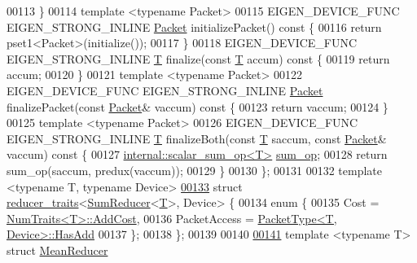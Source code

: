 \begin{DoxyCode}
00113   \}
00114   \textcolor{keyword}{template} <\textcolor{keyword}{typename} Packet>
00115   EIGEN\_DEVICE\_FUNC EIGEN\_STRONG\_INLINE \hyperlink{union_eigen_1_1internal_1_1_packet}{Packet} initializePacket()\textcolor{keyword}{ const }\{
00116     \textcolor{keywordflow}{return} pset1<Packet>(initialize());
00117   \}
00118   EIGEN\_DEVICE\_FUNC EIGEN\_STRONG\_INLINE \hyperlink{group___sparse_core___module}{T} finalize(\textcolor{keyword}{const} \hyperlink{group___sparse_core___module}{T} accum)\textcolor{keyword}{ const }\{
00119     \textcolor{keywordflow}{return} accum;
00120   \}
00121   \textcolor{keyword}{template} <\textcolor{keyword}{typename} Packet>
00122   EIGEN\_DEVICE\_FUNC EIGEN\_STRONG\_INLINE \hyperlink{union_eigen_1_1internal_1_1_packet}{Packet} finalizePacket(\textcolor{keyword}{const} \hyperlink{union_eigen_1_1internal_1_1_packet}{Packet}& vaccum)\textcolor{keyword}{ const }\{
00123     \textcolor{keywordflow}{return} vaccum;
00124   \}
00125   \textcolor{keyword}{template} <\textcolor{keyword}{typename} Packet>
00126   EIGEN\_DEVICE\_FUNC EIGEN\_STRONG\_INLINE \hyperlink{group___sparse_core___module}{T} finalizeBoth(\textcolor{keyword}{const} \hyperlink{group___sparse_core___module}{T} saccum, \textcolor{keyword}{const} 
      \hyperlink{union_eigen_1_1internal_1_1_packet}{Packet}& vaccum)\textcolor{keyword}{ const }\{
00127     \hyperlink{struct_eigen_1_1internal_1_1scalar__sum__op}{internal::scalar\_sum\_op<T>} \hyperlink{struct_eigen_1_1internal_1_1sum__op}{sum\_op};
00128     \textcolor{keywordflow}{return} sum\_op(saccum, predux(vaccum));
00129   \}
00130 \};
00131 
00132 \textcolor{keyword}{template} <\textcolor{keyword}{typename} T, \textcolor{keyword}{typename} Device>
\hyperlink{struct_eigen_1_1internal_1_1reducer__traits_3_01_sum_reducer_3_01_t_01_4_00_01_device_01_4}{00133} \textcolor{keyword}{struct }\hyperlink{struct_eigen_1_1internal_1_1reducer__traits}{reducer\_traits}<\hyperlink{struct_eigen_1_1internal_1_1_sum_reducer}{SumReducer}<\hyperlink{group___sparse_core___module}{T}>, Device> \{
00134   \textcolor{keyword}{enum} \{
00135     Cost = \hyperlink{group___core___module_struct_eigen_1_1_num_traits}{NumTraits<T>::AddCost},
00136     PacketAccess = \hyperlink{struct_eigen_1_1_packet_type}{PacketType<T, Device>::HasAdd}
00137   \};
00138 \};
00139 
00140 
\hyperlink{struct_eigen_1_1internal_1_1_mean_reducer}{00141} \textcolor{keyword}{template} <\textcolor{keyword}{typename} T> \textcolor{keyword}{struct }\hyperlink{struct_eigen_1_1internal_1_1_mean_reducer}{MeanReducer}

\end{DoxyCode}
